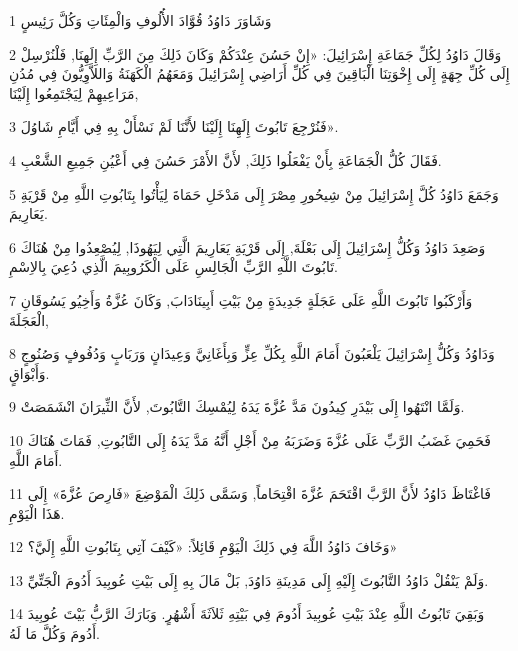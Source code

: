 \par 1 وَشَاوَرَ دَاوُدُ قُوَّادَ الأُلُوفِ وَالْمِئَاتِ وَكُلَّ رَئِيسٍ
\par 2 وَقَالَ دَاوُدُ لِكُلِّ جَمَاعَةِ إِسْرَائِيلَ: «إِنْ حَسُنَ عِنْدَكُمْ وَكَانَ ذَلِكَ مِنَ الرَّبِّ إِلَهِنَا, فَلْنُرْسِلْ إِلَى كُلِّ جِهَةٍ إِلَى إِخْوَتِنَا الْبَاقِينَ فِي كُلِّ أَرَاضِي إِسْرَائِيلَ وَمَعَهُمُ الْكَهَنَةُ وَاللاَّوِيُّونَ فِي مُدُنِ مَرَاعِيهِمْ لِيَجْتَمِعُوا إِلَيْنَا,
\par 3 فَنُرْجِعَ تَابُوتَ إِلَهِنَا إِلَيْنَا لأَنَّنَا لَمْ نَسْأَلْ بِهِ فِي أَيَّامِ شَاوُلَ».
\par 4 فَقَالَ كُلُّ الْجَمَاعَةِ بِأَنْ يَفْعَلُوا ذَلِكَ, لأَنَّ الأَمْرَ حَسُنَ فِي أَعْيُنِ جَمِيعِ الشَّعْبِ.
\par 5 وَجَمَعَ دَاوُدُ كُلَّ إِسْرَائِيلَ مِنْ شِيحُورِ مِصْرَ إِلَى مَدْخَلِ حَمَاةَ لِيَأْتُوا بِتَابُوتِ اللَّهِ مِنْ قَرْيَةِ يَعَارِيمَ.
\par 6 وَصَعِدَ دَاوُدُ وَكُلُّ إِسْرَائِيلَ إِلَى بَعْلَةَ, إِلَى قَرْيَةِ يَعَارِيمَ الَّتِي لِيَهُوذَا, لِيُصْعِدُوا مِنْ هُنَاكَ تَابُوتَ اللَّهِ الرَّبِّ الْجَالِسِ عَلَى الْكَرُوبِيمَ الَّذِي دُعِيَ بِالاِسْمِ.
\par 7 وَأَرْكَبُوا تَابُوتَ اللَّهِ عَلَى عَجَلَةٍ جَدِيدَةٍ مِنْ بَيْتِ أَبِينَادَابَ, وَكَانَ عُزَّةُ وَأَخِيُو يَسُوقَانِ الْعَجَلَةَ,
\par 8 وَدَاوُدُ وَكُلُّ إِسْرَائِيلَ يَلْعَبُونَ أَمَامَ اللَّهِ بِكُلِّ عِزٍّ وَبِأَغَانِيَّ وَعِيدَانٍ وَرَبَابٍ وَدُفُوفٍ وَصُنُوجٍ وَأَبْوَاقٍ.
\par 9 وَلَمَّا انْتَهُوا إِلَى بَيْدَرِ كِيدُونَ مَدَّ عُزَّةَ يَدَهُ لِيُمْسِكَ التَّابُوتَ, لأَنَّ الثِّيرَانَ انْشَمَصَتْ.
\par 10 فَحَمِيَ غَضَبُ الرَّبِّ عَلَى عُزَّةَ وَضَرَبَهُ مِنْ أَجْلِ أَنَّهُ مَدَّ يَدَهُ إِلَى التَّابُوتِ, فَمَاتَ هُنَاكَ أَمَامَ اللَّهِ.
\par 11 فَاغْتَاظَ دَاوُدُ لأَنَّ الرَّبَّ اقْتَحَمَ عُزَّةَ اقْتِحَاماً, وَسَمَّى ذَلِكَ الْمَوْضِعَ «فَارِصَ عُزَّةَ» إِلَى هَذَا الْيَوْمِ.
\par 12 وَخَافَ دَاوُدُ اللَّهَ فِي ذَلِكَ الْيَوْمِ قَائِلاً: «كَيْفَ آتِي بِتَابُوتِ اللَّهِ إِلَيَّ؟»
\par 13 وَلَمْ يَنْقُلْ دَاوُدُ التَّابُوتَ إِلَيْهِ إِلَى مَدِينَةِ دَاوُدَ, بَلْ مَالَ بِهِ إِلَى بَيْتِ عُوبِيدَ أَدُومَ الْجَتِّيِّ.
\par 14 وَبَقِيَ تَابُوتُ اللَّهِ عِنْدَ بَيْتِ عُوبِيدَ أَدُومَ فِي بَيْتِهِ ثَلاَثَةَ أَشْهُرٍ. وَبَارَكَ الرَّبُّ بَيْتَ عُوبِيدَ أَدُومَ وَكُلَّ مَا لَهُ.

